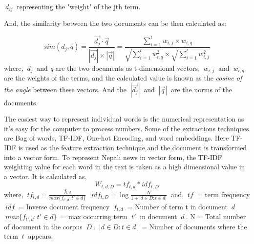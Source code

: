 \documentclass[12pt]{report}
\begin{document}
        $~{d_{ij}}~$ representing the "weight" of the jth term\cite{salton1975vector}.

        And, the similarity between the two documents can be then calculated as:
       
            \begin{equation}
                  sim(d_j, q) =  \frac{  \vec{d_j} \cdot \vec{q}  } {|\vec{d_j}|  \times |\vec{q}|  }   
                = \frac{\sum_{i=1}^{t}w_{i,j}\times w_{i,q}} {\sqrt{\sum_{i=1}^{t}w_{i,q}^2} \times \sqrt{\sum_{i=1}^{t}w_{i,j}^2}}
            \end{equation}
            where, \textit{$~{d_j}~$} and \emph{q} are the two documents as t-dimensional vectors, $~{w_{i,j}}~$ and $~{w_{i,q}}~$ are the weights of the terms, and the calculated value is known 
            as the \emph{cosine of the angle} between these vectors\cite{baeza1999modern}. And the $~{|\vec{d_j}|}~$ and $~{|\vec{q}|}~$ are the norms of the documents.
        
            The easiest way to represent individual words is the numerical representation as it's easy for the computer to process numbers. Some of 
        the extractions techniques are Bag of words, TF-IDF, One-hot Encoding, and word embeddings. 
        Here TF-IDF\cite{schutze2008introduction} is used as the feature extraction technique and the document is transformed into a vector form.
        To represent Nepali news in vector form, the TF-IDF weighting value for each word in the text is taken as a high dimensional
        value in a vector. It is calculated as,    
        \begin{equation} W_{t, d, D} = tf_{t, d} * idf_{t, D} \end{equation}  
         where,\newline
        $~{tf_{t, d} = \frac{f_{t,d}}{max\{f_{t', d} : t' \in d\}}}~$ \newline
        $~{idf_{t, D} = \log \frac{N}{1+  | {d \in D: t \in d}  |}}~$ \newline
            and,\newline
        $~{tf}~$ = term frequency\newline
        $~{idf}~$ = Inverse document frequency\newline
        $~{f_{t,d}}~$ = Number of term t in document $~{d}~$\newline
        $~{max\{f_{t', d} : t' \in d\} }~$ = max occurring term $~{t'}~$ in document $~{d}~$.\newline
        N = Total number of document in the corpus $~{D}~$.\newline
        $~{|{d \in D: t \in d}|}~$ = Number of documents where the term $~{t}~$ appears. \newline
\end{document}
